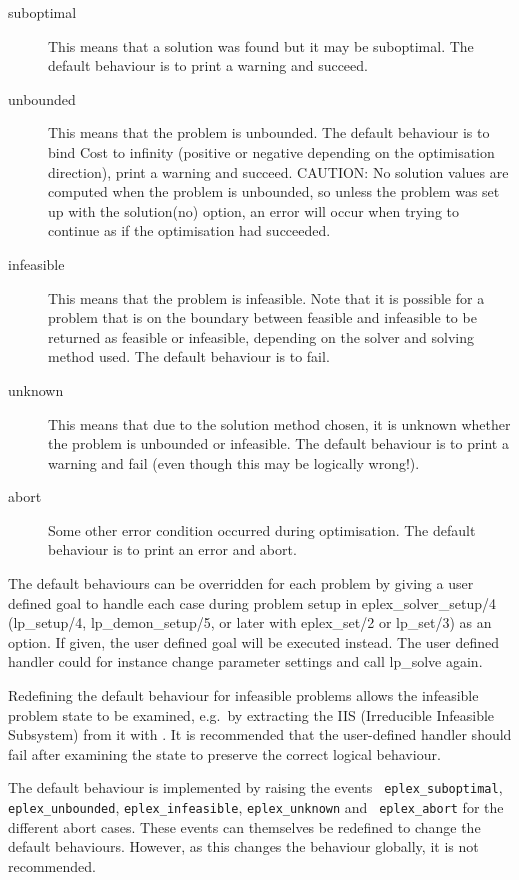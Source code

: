 \begin{description}
    \item[suboptimal]
    	This means that a solution was found but it may be suboptimal.
	The default behaviour is to print a warning and succeed.
    \item[unbounded]
	This means that the problem is unbounded.  The default
	behaviour is to bind Cost to infinity (positive or negative
	depending on the optimisation direction), print a warning and
	succeed.  CAUTION: No solution values are computed when the
	problem is unbounded, so unless the problem was set up with
	the solution(no) option, an error will occur when trying to
	continue as if the optimisation had succeeded.
   \item[infeasible]
        This means that the problem is infeasible. Note that it is possible
        for a problem that is on the boundary between feasible and
    	infeasible to be returned as feasible or infeasible, depending on
    	the solver and solving method used. The default behaviour is to
    	fail. 
    \item[unknown]
    	This means that due to the solution method chosen, it is unknown
	whether the problem is unbounded or infeasible. The default
	behaviour is to print a warning and fail (even though this
	may be logically wrong!).
    \item[abort]
    	Some other error condition occurred during optimisation.
	The default behaviour is to print an error and abort.
\end{description}

The default behaviours can be overridden for each problem by giving a user
defined goal to handle each case during problem setup in
eplex_solver_setup/4 (lp_setup/4, lp_demon_setup/5, or later with
eplex_set/2 or lp_set/3) as an option. If given, the user defined goal will
be executed instead. The user defined handler could for instance change
parameter settings and call lp_solve again. 

Redefining the default behaviour for infeasible problems allows the
infeasible problem state to be examined, e.g.\ by extracting the IIS
(Irreducible Infeasible Subsystem) from it with 
.
It is recommended that the
user-defined handler should fail after examining the state to preserve
the correct logical behaviour.
 
\label{lpevents}
The default behaviour is implemented by raising the events {\tt
eplex_suboptimal}, {\tt eplex_unbounded}, {\tt eplex_infeasible}, {\tt eplex_unknown} and {\tt
eplex_abort} for the different abort cases. These events can themselves be
redefined to change the default behaviours. However, as this changes the
behaviour globally, it is not recommended.

